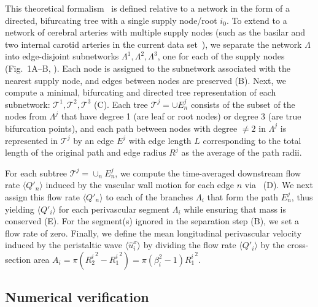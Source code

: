 \documentclass[fleqn,10pt]{wlscirep}
\begin{document}
This theoretical formalism~\cite{gjerde2023directional} is defined
relative to a network in the form of a directed, bifurcating tree with
a single supply node/root $i_0$. To extend to a network of cerebral
arteries with multiple supply nodes (such as the basilar and two
internal carotid arteries in the current data
set~\cite{hodneland2019new}), we separate the network $\Lambda$ into
edge-disjoint subnetworks $\Lambda^1, \Lambda^2, \Lambda^3$, one for
each of the supply nodes (Fig.~1A--B,
). Each node is assigned to the subnetwork
associated with the nearest supply node, and edges between nodes are
preserved (B). Next, we compute a minimal,
bifurcating and directed tree representation of each subnetwork:
$\mathcal{T}^1, \mathcal{T}^2, \mathcal{T}^3$
(C). Each tree $\mathcal{T}^j = \cup E_n^j$
consists of the subset of the nodes from $\Lambda^j$ that have degree
1 (are leaf or root nodes) or degree $3$ (are true bifurcation
points), and each path between nodes with degree $\not = 2$ in
$\Lambda^j$ is represented in $\mathcal{T}^j$ by an edge $E^j$ with
edge length $L$ corresponding to the total length of the original path
and edge radius $R^j$ as the average of the path radii.

For each subtree $\mathcal{T}^j = \cup_n E_n^j$, we compute the
time-averaged downstream flow rate $\langle Q'_n \rangle$ induced by
the vascular wall motion for each edge $n$ via~\cite[eq.~(5),
  (34)]{gjerde2023directional} (D). We next
assign this flow rate $\langle Q'_n \rangle$ to each of the branches
$\Lambda_i$ that form the path $E_n^j$, thus yielding $\langle Q'_i
\rangle$ for each perivascular segment $\Lambda_i$ while ensuring that
mass is conserved (E). For the segment(s)
ignored in the separation step (B), we set a
flow rate of zero. Finally, we define the mean longitudinal
perivascular velocity induced by the peristaltic wave $\langle
\hat{u}^x_i \rangle$ by dividing the flow rate $\langle Q'_i \rangle$
by the cross-section area $A_i = \pi ({R_2^i}^2 - {R_1^i}^2) = \pi
(\beta_i^2 - 1) {R_1^i}^2$.

\subsection{Numerical verification}
\label{sec:app:verification}
\end{document}
